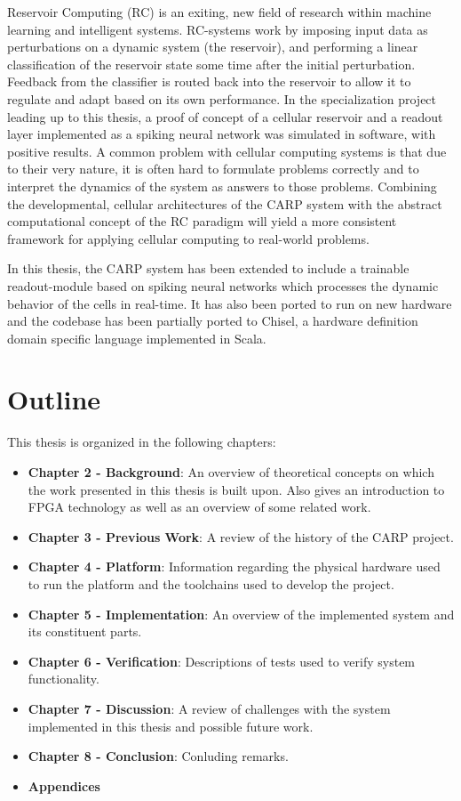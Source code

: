 Reservoir Computing (RC) is an exiting, new field of research within machine
learning and intelligent systems. RC-systems work by imposing input data as
perturbations on a dynamic system (the reservoir), and performing a linear
classification of the reservoir state some time after the initial perturbation.
Feedback from the classifier is routed back into the reservoir to allow it to
regulate and adapt based on its own performance. In the specialization project
leading up to this thesis, a proof of concept of a cellular reservoir and a
readout layer implemented as a spiking neural network was simulated in software,
with positive results. A common problem with cellular computing systems is that
due to their very nature, it is often hard to formulate problems correctly and
to interpret the dynamics of the system as answers to those problems. Combining
the developmental, cellular architectures of the CARP system with the abstract
computational concept of the RC paradigm will yield a more consistent framework
for applying cellular computing to real-world problems.

In this thesis, the CARP system has been extended to include a trainable
readout-module based on spiking neural networks which processes the dynamic
behavior of the cells in real-time. It has also been ported to run on new
hardware and the codebase has been partially ported to Chisel, a hardware
definition domain specific language implemented in Scala.

\section{Outline}

This thesis is organized in the following chapters:

\begin{itemize}
\item \textbf{Chapter 2 - Background}: An overview of theoretical concepts on which the
  work presented in this thesis is built upon. Also gives an introduction to
  FPGA technology as well as an overview of some related work.
\item \textbf{Chapter 3 - Previous Work}: A review of the history of the CARP project.
\item \textbf{Chapter 4 - Platform}: Information regarding the physical hardware used to
  run the platform and the toolchains used to develop the project.
\item \textbf{Chapter 5 - Implementation}: An overview of the implemented system and its
  constituent parts.
\item \textbf{Chapter 6 - Verification}: Descriptions of tests used to verify system functionality.
\item \textbf{Chapter 7 - Discussion}: A review of challenges with the system implemented
  in this thesis and possible future work.
\item \textbf{Chapter 8 - Conclusion}: Conluding remarks.
\item \textbf{Appendices}
\end{itemize}

\cleardoublepage
